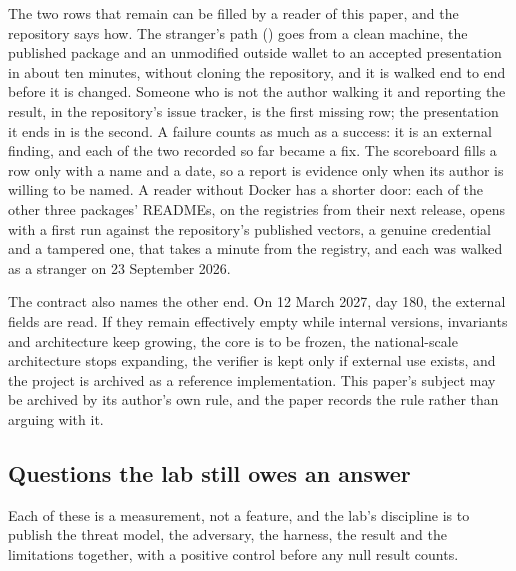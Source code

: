 The two rows that remain can be filled by a reader of this paper, and the repository says how. The
stranger's path () goes from a clean machine, the published package and an
unmodified outside wallet to an accepted presentation in about ten minutes, without cloning the
repository, and it is walked end to end before it is changed. Someone who is not the author walking
it and reporting the result, in the repository's issue tracker, is the first missing row; the
presentation it ends in is the second. A failure counts as much as a success: it is an external
finding, and each of the two recorded so far became a fix. The scoreboard fills a row only with a
name and a date, so a report is evidence only when its author is willing to be named. A reader
without Docker has a shorter door: each of the other three packages' READMEs, on the registries from their next release, opens with a first run
against the repository's published vectors, a genuine credential and a tampered one, that takes a
minute from the registry, and each was walked as a stranger on 23 September 2026. \sExt

The contract also names the other end. On 12 March 2027, day 180, the external fields are read. If
they remain effectively empty while internal versions, invariants and architecture keep growing, the
core is to be frozen, the national-scale architecture stops expanding, the verifier is kept only if
external use exists, and the project is archived as a reference implementation. This paper's subject
may be archived by its author's own rule, and the paper records the rule rather than arguing with
it. \sExt

\subsection{Questions the lab still owes an answer}

Each of these is a measurement, not a feature, and the lab's discipline is to publish the threat
model, the adversary, the harness, the result and the limitations together, with a positive control
before any null result counts.

